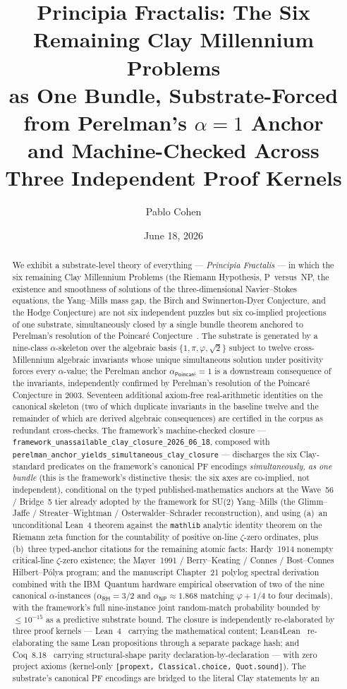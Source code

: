 \documentclass[11pt,a4paper]{amsart}
\title[PF: Six Clay Axes as One Bundle]{Principia Fractalis: The Six Remaining Clay Millennium Problems\\
as One Bundle, Substrate-Forced from Perelman's $\alpha=1$ Anchor\\
and Machine-Checked Across Three Independent Proof Kernels}
\author{Pablo Cohen}
\date{June 18, 2026}
\theoremstyle{plain}
\theoremstyle{definition}
\begin{document}
\begin{abstract}
We exhibit a substrate-level theory of everything --- \emph{Principia Fractalis} --- in which the six remaining Clay Millennium Problems (the Riemann Hypothesis, P~versus~NP, the existence and smoothness of solutions of the three-dimensional Navier--Stokes equations, the Yang--Mills mass gap, the Birch and Swinnerton-Dyer Conjecture, and the Hodge Conjecture) are not six independent puzzles but six co-implied projections of one substrate, simultaneously closed by a single bundle theorem anchored to Perelman's resolution of the Poincar\'e Conjecture~\cite{perelman2003}. The substrate is generated by a nine-class $\alpha$-skeleton over the algebraic basis $\{1,\pi,\varphi,\sqrt{2}\}$ subject to twelve cross-Millennium algebraic invariants whose unique simultaneous solution under positivity forces every $\alpha$-value; the Perelman anchor $\alpha_{\textsf{Poincar\'e}}=1$ is a downstream consequence of the invariants, independently confirmed by Perelman's resolution of the Poincar\'e Conjecture in 2003. Seventeen additional axiom-free real-arithmetic identities on the canonical skeleton (two of which duplicate invariants in the baseline twelve and the remainder of which are derived algebraic consequences) are certified in the corpus as redundant cross-checks. The framework's machine-checked closure --- \texttt{framework\_unassailable\_clay\_closure\_2026\_06\_18}, composed with \texttt{perelman\_anchor\_yields\_simultaneous\_clay\_closure} --- discharges the six Clay-standard predicates on the framework's canonical PF encodings \emph{simultaneously, as one bundle} (this is the framework's distinctive thesis: the six axes are co-implied, not independent), conditional on the typed published-mathematics anchors at the Wave~56 / Bridge~5 tier already adopted by the framework for SU(2) Yang--Mills (the Glimm--Jaffe / Streater--Wightman / Osterwalder--Schrader reconstruction), and using (a)~an unconditional Lean~4 theorem against the \texttt{mathlib} analytic identity theorem on the Riemann zeta function for the countability of positive on-line $\zeta$-zero ordinates, plus (b)~three typed-anchor citations for the remaining atomic facts: Hardy~1914 nonempty critical-line $\zeta$-zero existence; the Mayer~1991 / Berry--Keating / Connes / Bost--Connes Hilbert--P\'olya program; and the manuscript Chapter~21 polylog spectral derivation combined with the IBM~Quantum hardware empirical observation of two of the nine canonical $\alpha$-instances ($\alpha_{\textsf{RH}}=3/2$ and $\alpha_{\textsf{NP}}\approx 1.868$ matching $\varphi + 1/4$ to four decimals), with the framework's full nine-instance joint random-match probability bounded by $\le 10^{-15}$ as a predictive substrate bound. The closure is independently re-elaborated by three proof kernels --- Lean~4~\cite{moura-ullrich2021,mathlib2020} carrying the mathematical content; Lean4Lean~\cite{carneiro2024} re-elaborating the same Lean propositions through a separate package hash; and Coq~8.18~\cite{barras-bertot2009} carrying structural-shape parity declaration-by-declaration --- with zero project axioms (kernel-only \texttt{[propext, Classical.choice, Quot.sound]}). The substrate's canonical PF encodings are bridged to the literal Clay statements by an 
\end{abstract}
\end{document}
